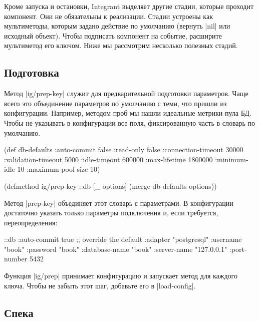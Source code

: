 Кроме запуска и остановки, Integrant выделяет другие стадии, которые
проходит компонент. Они не обязательны к реализации. Стадии устроены как
мультиметоды, которым задано действие по умолчанию (вернуть \spverb|nil| или
исходный объект). Чтобы подписать компонент на событие, расширите мультиметод
его ключом. Ниже мы рассмотрим несколько полезных стадий.

\subsection{Подготовка}

Метод \spverb|ig/prep-key| служит для предварительной подготовки
параметров. Чаще всего это объединение параметров по умолчанию с теми, что
пришли из конфигурации. Например, методом проб мы нашли идеальные метрики пула
БД. Чтобы не указывать в конфигурации все поля, фиксированную часть в словарь по
умолчанию.

\begin{english}
  \begin{clojure}
(def db-defaults
  {:auto-commit        false
   :read-only          false
   :connection-timeout 30000
   :validation-timeout 5000
   :idle-timeout       600000
   :max-lifetime       1800000
   :minimum-idle       10
   :maximum-pool-size  10})

(defmethod ig/prep-key ::db
  [_ options]
  (merge db-defaults options))
  \end{clojure}
\end{english}

Метод \spverb|prep-key| объединяет этот словарь с параметрами. В конфигурации
достаточно указать только параметры подключения и, если требуется,
переопределения:

\begin{english}
  \begin{clojure}
{::db {:auto-commit   true ;; override the default
       :adapter       "postgresql"
       :username      "book"
       :password      "book"
       :database-name "book"
       :server-name   "127.0.0.1"
       :port-number   5432}}
  \end{clojure}
\end{english}

Функция \spverb|ig/prep| принимает конфигурацию и запускает метод для каждого
ключа. Чтобы не забыть этот шаг, добавьте его в \spverb|load-config|.

\subsection{Спека}

